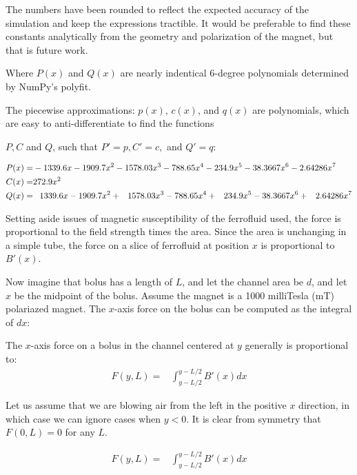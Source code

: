\documentclass[]{asme2ej}
\begin{document}
The numbers have been rounded to reflect the expected accuracy of the simulation and keep the expressions tractible.
It would be preferable to find these constants analytically from the
geometry and polarization of the magnet, but that is future work.

Where $P(x)$ and $Q(x)$ are nearly indentical 6-degree polynomials determined
by NumPy's polyfit.

The piecewise approximations: $p(x)$, $c(x)$, and $q(x)$ are
polynomials, which are easy to anti-differentiate to find the functions

$P,C$ and $Q$, such that $P' = p, C' = c,$ and $Q' = q$:

\begin{align}
  P(x) = & -1339.6 x - 1909.7 x^2 - 1578.03 x^3 - 788.65 x^4 - 234.9 x^5 - 38.3667 x^6 - 2.64286 x^7 \\
  C(x) = & 272.9 x^2 \\
  Q(x) = &  \hphantom{-}1339.6 x - 1909.7 x^2 + \hphantom{-}1578.03 x^3 - 788.65 x^4 + \hphantom{-}234.9 x^5 - 38.3667 x^6 + \hphantom{-}2.64286 x^7 \\
\end{align}





Setting aside issues of magnetic susceptibility of the ferrofluid used, the force is proportional
to the field strength times the area. Since the area is unchanging in a simple tube, the force on
a slice of ferrofluid at position $x$ is proportional to $B'(x)$.



Now imagine that bolus has a length of $L$, and let the channel area be $d$, and let $x$ be
the midpoint of the bolus.
Assume the magnet is a 1000 milliTesla (mT) polariazed magnet.
The $x$-axis force on the bolus can be computed as the integral of $dx$:

The $x$-axis force on a bolus in the channel centered at $y$ generally is proportional to:
\begin{align}
  F(y,L) = & \int_{y-L/2}^{y-L/2} B'(x) dx
\end{align}

Let us assume that we are blowing air from the left in the positive $x$ direction, in which case
we can ignore cases when $y < 0$. It is clear from symmetry that $ F(0,L) = 0 $ for any $L$.

\begin{align}
  F(y,L) = & \int_{y-L/2}^{y-L/2} B'(x) dx
\end{align}
\end{document}
